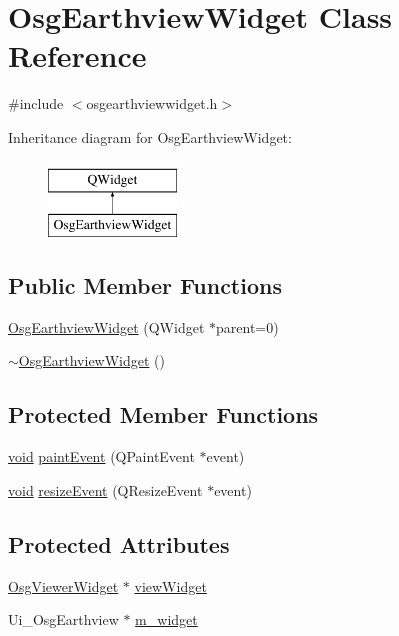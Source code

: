 \hypertarget{class_osg_earthview_widget}{\section{Osg\-Earthview\-Widget Class Reference}
\label{class_osg_earthview_widget}
}


{\ttfamily \#include $<$osgearthviewwidget.\-h$>$}

Inheritance diagram for Osg\-Earthview\-Widget\-:\begin{figure}[H]
\begin{center}
\leavevmode
\includegraphics[height=2.000000cm]{class_osg_earthview_widget}
\end{center}
\end{figure}
\subsection*{Public Member Functions}
\begin{DoxyCompactItemize}
\item 
\hyperlink{class_osg_earthview_widget_a6a67cd33434862cae536141fdcb5c06d}{Osg\-Earthview\-Widget} (Q\-Widget $\ast$parent=0)
\item 
\hyperlink{class_osg_earthview_widget_ad7f1b72afdc75d82601da60cdc833a59}{$\sim$\-Osg\-Earthview\-Widget} ()
\end{DoxyCompactItemize}
\subsection*{Protected Member Functions}
\begin{DoxyCompactItemize}
\item 
\hyperlink{group___u_a_v_objects_plugin_ga444cf2ff3f0ecbe028adce838d373f5c}{void} \hyperlink{class_osg_earthview_widget_a4f399854052930abec7f1b113c840d5b}{paint\-Event} (Q\-Paint\-Event $\ast$event)
\item 
\hyperlink{group___u_a_v_objects_plugin_ga444cf2ff3f0ecbe028adce838d373f5c}{void} \hyperlink{class_osg_earthview_widget_a2419e5469f3c595b7ab76fc225a63d6c}{resize\-Event} (Q\-Resize\-Event $\ast$event)
\end{DoxyCompactItemize}
\subsection*{Protected Attributes}
\begin{DoxyCompactItemize}
\item 
\hyperlink{class_osg_viewer_widget}{Osg\-Viewer\-Widget} $\ast$ \hyperlink{class_osg_earthview_widget_a2a1b22b5eafba67d10492824bdd9bdb8}{view\-Widget}
\item 
Ui\-\_\-\-Osg\-Earthview $\ast$ \hyperlink{class_osg_earthview_widget_ae0c3908fd9605c584166ab5e476995c1}{m\-\_\-widget}
\end{DoxyCompactItemize}


